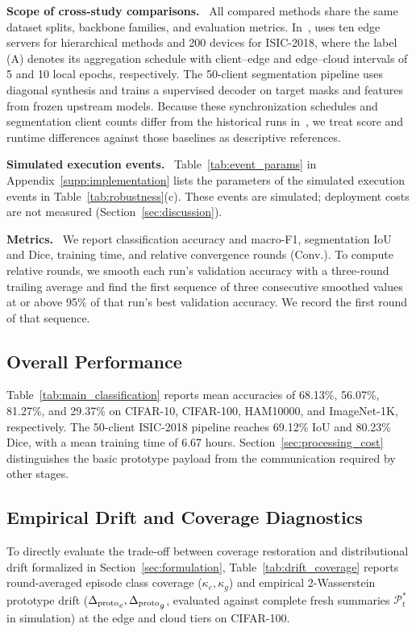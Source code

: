 \noindent\textbf{Scope of cross-study comparisons.}~
All compared methods share the same dataset splits, backbone families, and evaluation metrics. In~\cite{tran2026h}, \hsfp{} uses ten edge servers for hierarchical methods and 200 devices for ISIC-2018, where the label (A) denotes its aggregation schedule with client--edge and edge--cloud intervals of 5 and 10 local epochs, respectively. The 50-client \ehsfp{} segmentation pipeline uses diagonal synthesis and trains a supervised decoder on target masks and features from frozen upstream models. Because these synchronization schedules and segmentation client counts differ from the historical runs in~\cite{tran2026h}, we treat score and runtime differences against those baselines as descriptive references.

\noindent\textbf{Simulated execution events.}~
Table~\ref{tab:event_params} in Appendix~\ref{supp:implementation} lists the parameters of the simulated execution events in Table~\ref{tab:robustness}(c). These events are simulated; deployment costs are not measured (Section~\ref{sec:discussion}).

\noindent\textbf{Metrics.}~
We report classification accuracy and macro-F1, segmentation IoU and Dice, training time, and relative convergence rounds (Conv.). To compute relative rounds, we smooth each run's validation accuracy with a three-round trailing average and find the first sequence of three consecutive smoothed values at or above 95\% of that run's best validation accuracy. We record the first round of that sequence.

\subsection{Overall Performance}

Table~\ref{tab:main_classification} reports \ehsfp{} mean accuracies of 68.13\%, 56.07\%, 81.27\%, and 29.37\% on CIFAR-10, CIFAR-100, HAM10000, and ImageNet-1K, respectively. The 50-client ISIC-2018 pipeline reaches 69.12\% IoU and 80.23\% Dice, with a mean training time of 6.67 hours. Section~\ref{sec:processing_cost} distinguishes the basic prototype payload from the communication required by other stages.

\subsection{Empirical Drift and Coverage Diagnostics}
\label{sec:drift_diagnostics}

To directly evaluate the trade-off between coverage restoration and distributional drift formalized in Section~\ref{sec:formulation}, Table~\ref{tab:drift_coverage} reports round-averaged episode class coverage ($\kappa_e, \kappa_g$) and empirical 2-Wasserstein prototype drift (${\Delta_{\mathrm{proto}}}_e, {\Delta_{\mathrm{proto}}}_g$, evaluated against complete fresh summaries $\mathcal P_t^*$ in simulation) at the edge and cloud tiers on CIFAR-100.

